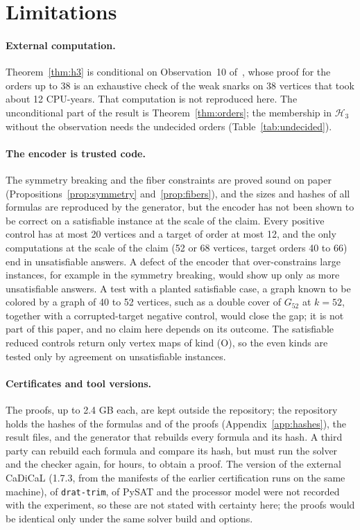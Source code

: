 \documentclass[11pt]{article}
\theoremstyle{definition}
\theoremstyle{remark}
\newcommand{\Hthree}{\mathcal{H}_3}
\newcommand{\Ga}{G_{52}}
\begin{document}
\section{Limitations}\label{sec:limitations}

\paragraph{External computation.} Theorem~\ref{thm:h3} is conditional on Observation~10 of~\cite{GJMMMU2026}, whose proof for the orders up to 38 is an exhaustive check of the weak snarks on 38 vertices that took about 12 CPU-years. That computation is not reproduced here. The unconditional part of the result is Theorem~\ref{thm:orders}; the membership in $\Hthree$ without the observation needs the undecided orders (Table~\ref{tab:undecided}).

\paragraph{The encoder is trusted code.} The symmetry breaking and the fiber constraints are proved sound on paper (Propositions~\ref{prop:symmetry} and~\ref{prop:fibers}), and the sizes and hashes of all formulas are reproduced by the generator, but the encoder has not been shown to be correct on a satisfiable instance at the scale of the claim. Every positive control has at most 20 vertices and a target of order at most 12, and the only
computations at the scale of the claim (52 or 68 vertices, target orders 40 to 66) end in unsatisfiable answers. A defect of the encoder that over-constrains large instances, for example in the symmetry breaking, would show up only as more unsatisfiable answers. A test with a planted satisfiable case, a graph known to be colored by a graph of 40 to 52 vertices, such as a double cover of $\Ga$ at $k = 52$, together with a corrupted-target
negative control, would close the gap; it is not part of this paper, and no claim here depends on its outcome. The satisfiable reduced controls return only vertex maps of kind (O), so the even kinds are tested only by agreement on unsatisfiable instances.

\paragraph{Certificates and tool versions.} The proofs, up to 2.4 GB each, are kept outside the repository; the repository holds the hashes of the formulas and of the proofs (Appendix~\ref{app:hashes}), the result files, and the generator that rebuilds every formula and its hash. A third party can rebuild each formula and compare its hash, but must run the solver and the checker again, for hours, to obtain a proof. The version of the external
CaDiCaL (1.7.3, from the manifests of the earlier certification runs on the same machine), of \texttt{drat-trim}, of PySAT and the processor model were not recorded with the experiment, so these are not stated with certainty here; the proofs would be identical only under the same solver build and options.
\end{document}
